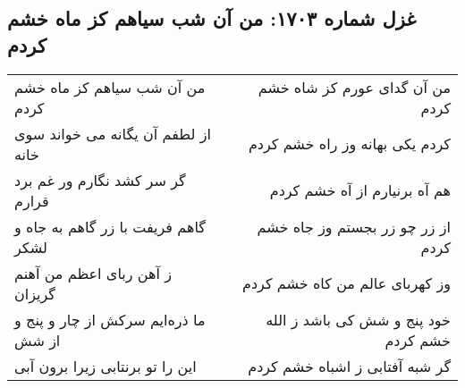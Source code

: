\begin{center}
\section*{غزل شماره ۱۷۰۳: من آن شب سیاهم کز ماه خشم کردم}
\label{sec:1703}
\begin{longtable}{l p{0.5cm} r}
من آن شب سیاهم کز ماه خشم کردم
&&
من آن گدای عورم کز شاه خشم کردم
\\
از لطفم آن یگانه می خواند سوی خانه
&&
کردم یکی بهانه وز راه خشم کردم
\\
گر سر کشد نگارم ور غم برد قرارم
&&
هم آه برنیارم از آه خشم کردم
\\
گاهم فریفت با زر گاهم به جاه و لشکر
&&
از زر چو زر بجستم وز جاه خشم کردم
\\
ز آهن ربای اعظم من آهنم گریزان
&&
وز کهربای عالم من کاه خشم کردم
\\
ما ذره‌ایم سرکش از چار و پنج و از شش
&&
خود پنج و شش کی باشد ز الله خشم کردم
\\
این را تو برنتابی زیرا برون آبی
&&
گر شبه آفتابی ز اشباه خشم کردم
\\
\end{longtable}
\end{center}
